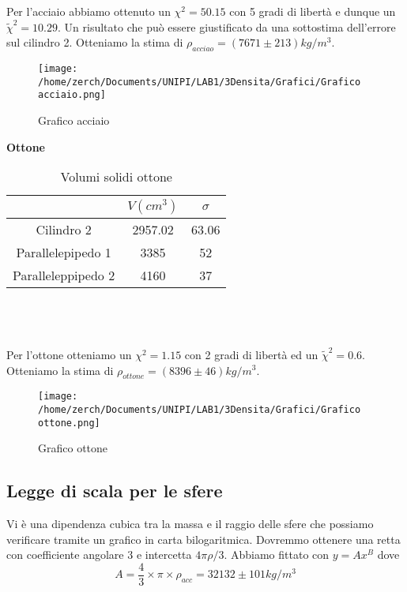 \documentclass[a4paper,10pt]{article}
\begin{document}
Per l'acciaio abbiamo ottenuto un $\chi^2=50.15$ con 5 gradi di libertà e dunque un $\tilde\chi^2=10.29$.
Un risultato che può essere giustificato da una sottostima dell'errore sul cilindro 2.
Otteniamo la stima di $\rho_{acciao}=(7671 \pm 213)kg/m^3$.
\begin{figure}[!htb]
 \centering
 \caption{Grafico acciaio}
  \texttt{[image: /home/zerch/Documents/UNIPI/LAB1/3Densita/Grafici/Grafico acciaio.png]}
\end{figure}
\textbf{Ottone}
\begin{table}[!htb]
\centering
\caption{Volumi solidi ottone}
\label{my-label}
\begin{tabular}{c|c|c}
\hline
                   & $V(cm^3)$ & $\sigma$ \\ \hline
Cilindro 2         & 2957.02                       & 63.06  \\ \hline
Parallelepipedo 1  & 3385                          & 52     \\ \hline
Paralleleppipedo 2 & 4160                          & 37     \\ 
\end{tabular}
\end{table}\\\\\\
Per l'ottone otteniamo un $\chi^2=1.15$ con 2 gradi di libertà ed un $\tilde\chi^2=0.6$.
Otteniamo la stima di $\rho_{ottone}=(8396 \pm 46)kg/m^3$.
\begin{figure}[!htb]
\begin{center}
\centering 
\caption{Grafico ottone}
  \texttt{[image: /home/zerch/Documents/UNIPI/LAB1/3Densita/Grafici/Grafico ottone.png]}
\end{center}
\end{figure}
\subsection{Legge di scala per le sfere}
Vi è una dipendenza cubica tra la massa e il raggio delle sfere che possiamo verificare tramite un grafico in carta bilogaritmica. Dovremmo ottenere una retta con coefficiente angolare 3 e intercetta $4\pi\rho/3$.
Abbiamo fittato con $y=Ax^B$ dove 
\begin{equation}
 A=\frac{4}{3} \times \pi \times \rho_{acc}=32132 \pm 101 kg/m^3
\end{equation}
\end{document}
